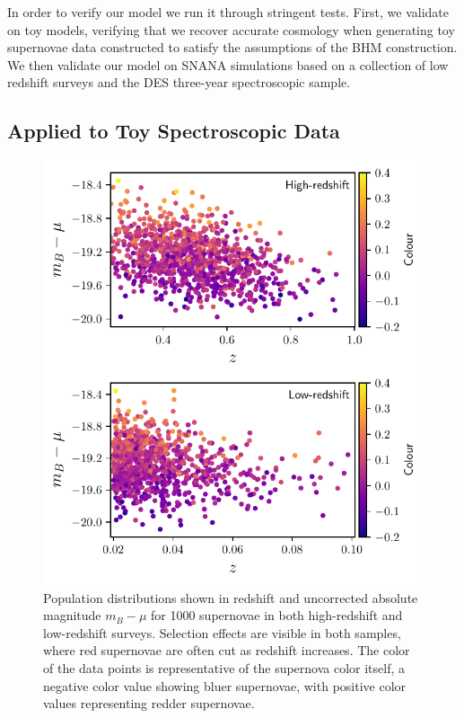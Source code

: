 \documentclass[a4paper,fleqn,usenatbib]{mnras}
\newcommand{\green}{\color{forestgreen}}
\begin{document}
In order to verify our model we run it through stringent tests. First, we validate on toy models, verifying that we recover accurate cosmology {\green when generating toy supernovae data constructed to satisfy the assumptions of the BHM construction}. We then validate our model on SNANA simulations based on a collection of low redshift surveys and the DES three-year spectroscopic sample.

\subsection{Applied to Toy Spectroscopic Data}
\label{sec:toy}


\begin{figure}
	\begin{center}
		\includegraphics[width=\columnwidth]{plot_pop_simple.pdf}
	\end{center}
	\caption{Population distributions shown in redshift and uncorrected absolute magnitude $m_B - \mu$ for 1000 supernovae in both high-redshift and low-redshift surveys. Selection effects are visible in both samples, where red supernovae are often cut as redshift increases. The color of the data points is representative of the supernova color itself, a negative color value showing bluer supernovae, with positive color values representing redder supernovae.}
	\label{fig:simple_pop}
\end{figure}
\end{document}
